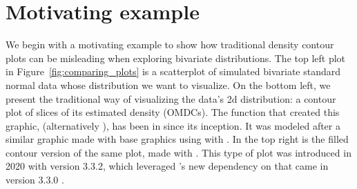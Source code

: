 



\section{Motivating example}\label{sec:example}

We begin with a motivating example to show how traditional density contour plots can be misleading when exploring bivariate distributions.
The top left plot in Figure~\ref{fig:comparing_plots} is a scatterplot of simulated bivariate standard normal data whose distribution we want to visualize.
On the bottom left, we present the traditional way of visualizing the data's 2d distribution: a contour plot of slices of its estimated density (OMDCs).
The function that created this graphic,  (alternatively ), has been in  since its inception.
It was modeled after a similar graphic made with base graphics using  with .
In the top right is the filled contour version of the same plot, made with .
This type of plot was introduced in 2020 with  version 3.3.2, which leveraged 's new dependency on  that came in  version 3.3.0 \citep{isoband}.


